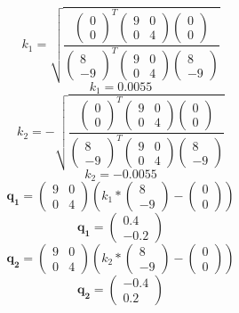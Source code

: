 \documentclass[journal,10pt,twocolumn]{article}
\let\vec\mathbf
\newcommand{\myvec}[1]{\ensuremath{\begin{pmatrix}#1\end{pmatrix}}}
\begin{document}
\begin{equation}
	k_1 = \sqrt{\frac{\myvec{0\\0}^T\myvec{9&0\\0&4}\myvec{0\\0}}{\myvec{8\\-9}^T\myvec{9&0\\0&4}\myvec{8\\-9}}}
\end{equation}
\begin{equation}
	k_1 = 0.0055
\end{equation}
\begin{equation}
	k_2 = - \sqrt{\frac{\myvec{0\\0}^T\myvec{9&0\\0&4}\myvec{0\\0}}{\myvec{8\\-9}^T\myvec{9&0\\0&4}\myvec{8\\-9}}}
\end{equation}
\begin{equation}
	k_2 = -0.0055
\end{equation}
\begin{equation}
	\vec{q_1} = \myvec{9&0\\0&4}(k_1*\myvec{8\\-9} - \myvec{0\\0})
\end{equation}
\begin{equation}
	\vec{q_1} = \myvec{ 0.4\\-0.2}
\end{equation}
\begin{equation}
	\vec{q_2} = \myvec{9&0\\0&4}(k_2*\myvec{8\\-9} - \myvec{0\\0})
\end{equation}
\begin{equation}
	\vec{q_2} = \myvec{-0.4\\0.2}
\end{equation}
\end{document}
